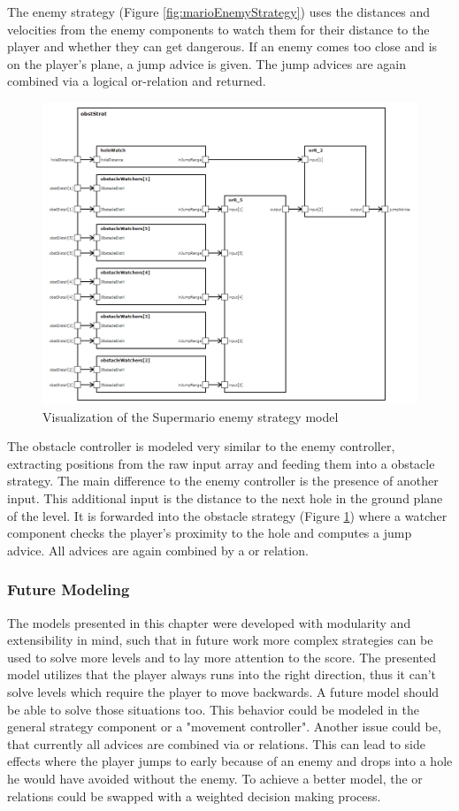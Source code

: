 The enemy strategy (Figure \ref{fig:marioEnemyStrategy}) uses the distances and velocities from the enemy components to watch them for their distance to the player and whether they can get dangerous. If an enemy comes too close and is on the player's plane, a jump advice is given. The jump advices are again combined via a logical or-relation and returned.

\begin{figure}
	\centering
	\includegraphics[width=\textwidth]{pictures/haller_obstaclestrategy.PNG}
	\caption{Visualization of the Supermario enemy strategy model}
	\label{fig:marioObstacleStrategy}
\end{figure}

The obstacle controller is modeled very similar to the enemy controller, extracting positions from the raw input array and feeding them into a obstacle strategy. The main difference to the enemy controller is the presence of another input. This additional input is the distance to the next hole in the ground plane of the level. It is forwarded into the obstacle strategy (Figure \ref{fig:marioObstacleStrategy}) where a watcher component checks the player's proximity to the hole and computes a jump advice. All advices are again combined by a or relation.

\subsubsection{Future Modeling}
The models presented in this chapter were developed with modularity and extensibility in mind, such that in future work more complex strategies can be used to solve more levels and to lay more attention to the score.
The presented model utilizes that the player always runs into the right direction, thus it can't solve levels which require the player to move backwards. A future model should be able to solve those situations too. This behavior could be modeled in the general strategy component or a "movement controller".
Another issue could be, that currently all advices are combined via or relations. This can lead to side effects where the player jumps to early because of an enemy and drops into a hole he would have avoided without the enemy. To achieve a better model, the or relations could be swapped with a weighted decision making process.